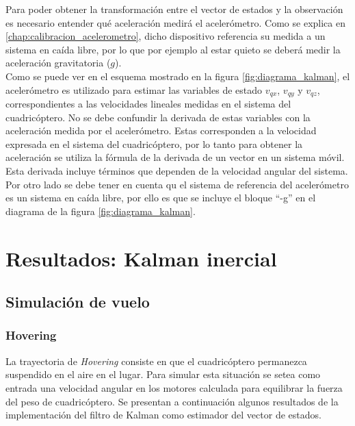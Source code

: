 \documentclass[main]{subfiles}
\begin{document}
Para poder obtener la transformación entre el vector de estados y la observación es necesario entender qué aceleración medirá el acelerómetro. Como se explica en \ref{chap:calibracion_acelerometro}, dicho dispositivo referencia su medida a un sistema en caída libre, por lo que por ejemplo al estar quieto se deberá medir la aceleración gravitatoria ($g$).\\
Como se puede ver en el esquema mostrado en la figura \ref{fig:diagrama_kalman}, el acelerómetro es utilizado para estimar las variables de estado $v_{qx}$, $v_{qy}$ y $v_{qz}$, correspondientes a las velocidades lineales medidas en el sistema del cuadricóptero. No se debe confundir la derivada de estas variables con la aceleración medida por el acelerómetro. Estas corresponden a la velocidad expresada en el sistema del cuadric\'optero, por lo tanto para obtener la aceleraci\'on se utiliza la f\'ormula de la derivada de un vector en un sistema m\'ovil. Esta derivada incluye t\'erminos que dependen de la velocidad angular del sistema.  Por otro lado se debe tener en cuenta qu el sistema de referencia del acelerómetro es un sistema en caída libre, por ello es que se incluye el bloque ``-g'' en el diagrama de la figura \ref{fig:diagrama_kalman}.



\section{Resultados: Kalman inercial}

\subsection{Simulación de vuelo}
\subsubsection{Hovering}
La trayectoria de \emph{Hovering} consiste en que el cuadricóptero permanezca suspendido en el aire en el lugar. Para simular esta situación se setea como entrada una velocidad angular en los motores calculada para equilibrar la fuerza del peso de cuadricóptero.
Se presentan a continuación algunos resultados de la implementación del filtro de Kalman como estimador del vector de estados.\\
\end{document}
